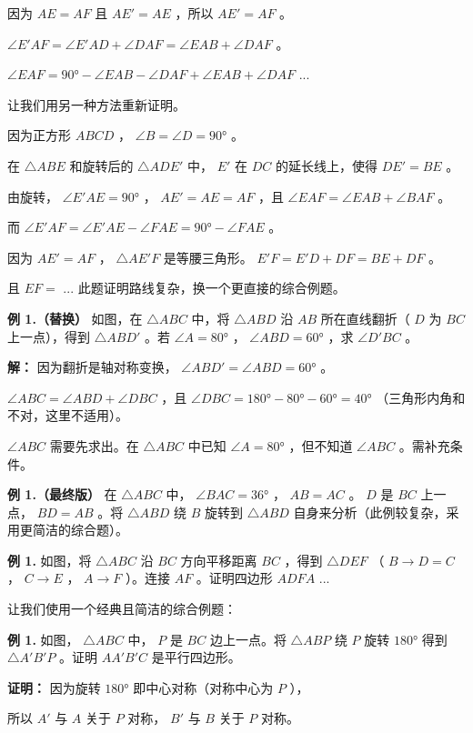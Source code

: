 \begin{workedexamples}
因为 $AE = AF$ 且 $AE' = AE$ ，所以 $AE' = AF$ 。

$\angle E'AF = \angle E'AD + \angle DAF = \angle EAB + \angle DAF$ 。

$\angle EAF = 90° - \angle EAB - \angle DAF + \angle EAB + \angle DAF$ ... 

让我们用另一种方法重新证明。

因为正方形 $ABCD$ ， $\angle B = \angle D = 90°$ 。

在 $\triangle ABE$ 和旋转后的 $\triangle ADE'$ 中， $E'$ 在 $DC$ 的延长线上，使得 $DE' = BE$ 。

由旋转， $\angle E'AE = 90°$ ， $AE' = AE = AF$ ，且 $\angle EAF = \angle EAB + \angle BAF$ 。

而 $\angle E'AF = \angle E'AE - \angle FAE = 90° - \angle FAE$ 。

因为 $AE' = AF$ ， $\triangle AE'F$ 是等腰三角形。 $E'F = E'D + DF = BE + DF$ 。

且 $EF = $ ... 此题证明路线复杂，换一个更直接的综合例题。

\textbf{例 1.（替换）} 如图，在 $\triangle ABC$ 中，将 $\triangle ABD$ 沿 $AB$ 所在直线翻折（ $D$ 为 $BC$ 上一点），得到 $\triangle ABD'$ 。若 $\angle A = 80°$ ， $\angle ABD = 60°$ ，求 $\angle D'BC$ 。

\textbf{解：}
因为翻折是轴对称变换， $\angle ABD' = \angle ABD = 60°$ 。

$\angle ABC = \angle ABD + \angle DBC$ ，且 $\angle DBC = 180° - 80° - 60° = 40°$ （三角形内角和不对，这里不适用）。

$\angle ABC$ 需要先求出。在 $\triangle ABC$ 中已知 $\angle A = 80°$ ，但不知道 $\angle ABC$ 。需补充条件。

\textbf{例 1.（最终版）} 在 $\triangle ABC$ 中， $\angle BAC = 36°$ ， $AB = AC$ 。 $D$ 是 $BC$ 上一点， $BD = AB$ 。将 $\triangle ABD$ 绕 $B$ 旋转到 $\triangle ABD$ 自身来分析（此例较复杂，采用更简洁的综合题）。

\textbf{例 1.} 如图，将 $\triangle ABC$ 沿 $BC$ 方向平移距离 $BC$ ，得到 $\triangle DEF$ （ $B \to D = C$ ， $C \to E$ ， $A \to F$ ）。连接 $AF$ 。证明四边形 $ADFA$ ... 

让我们使用一个经典且简洁的综合例题：

\textbf{例 1.} 如图， $\triangle ABC$ 中， $P$ 是 $BC$ 边上一点。将 $\triangle ABP$ 绕 $P$ 旋转 $180°$ 得到 $\triangle A'B'P$ 。证明 $AA'B'C$ 是平行四边形。

\textbf{证明：}
因为旋转 $180°$ 即中心对称（对称中心为 $P$ ），

所以 $A'$ 与 $A$ 关于 $P$ 对称， $B'$ 与 $B$ 关于 $P$ 对称。


\end{workedexamples}
